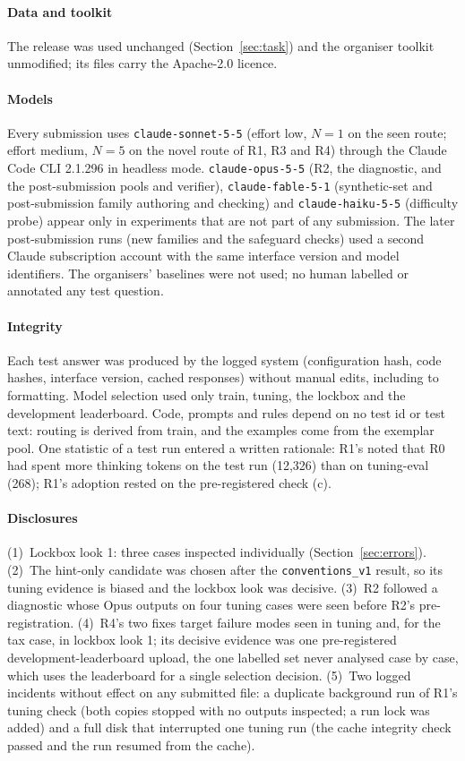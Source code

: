 \documentclass[conference]{IEEEtran}
\newcommand{\id}[1]{\texttt{#1}}
\begin{document}
\paragraph*{Data and toolkit}
The release was used unchanged (Section~\ref{sec:task}) and the organiser toolkit unmodified; its files carry the Apache-2.0 licence.

\paragraph*{Models}
Every submission uses \id{claude-sonnet-5-5} (effort low, $N=1$ on the seen route; effort medium, $N=5$ on the novel route of R1, R3 and R4) through the Claude Code CLI 2.1.296 in headless mode. \id{claude-opus-5-5} (R2, the diagnostic, and the post-submission pools and verifier), \id{claude-fable-5-1} (synthetic-set and post-submission family authoring and checking) and \id{claude-haiku-5-5} (difficulty probe) appear only in experiments that are not part of any submission. The later post-submission runs (new families and the safeguard checks) used a second Claude subscription account with the same interface version and model identifiers. The organisers' baselines were not used; no human labelled or annotated any test question.

\paragraph*{Integrity}
Each test answer was produced by the logged system (configuration hash, code hashes, interface version, cached responses) without manual edits, including to formatting. Model selection used only train, tuning, the lockbox and the development leaderboard. Code, prompts and rules depend on no test id or test text: routing is derived from train, and the examples come from the exemplar pool. One statistic of a test run entered a written rationale: R1's noted that R0 had spent more thinking tokens on the test run (12,326) than on tuning-eval (268); R1's adoption rested on the pre-registered check (c).

\paragraph*{Disclosures}
(1)~Lockbox look 1: three cases inspected individually (Section~\ref{sec:errors}). (2)~The hint-only candidate was chosen after the \id{conventions\_v1} result, so its tuning evidence is biased and the lockbox look was decisive. (3)~R2 followed a diagnostic whose Opus outputs on four tuning cases were seen before R2's pre-registration. (4)~R4's two fixes target failure modes seen in tuning and, for the tax case, in lockbox look 1; its decisive evidence was one pre-registered development-leaderboard upload, the one labelled set never analysed case by case, which uses the leaderboard for a single selection decision. (5)~Two logged incidents without effect on any submitted file: a duplicate background run of R1's tuning check (both copies stopped with no outputs inspected; a run lock was added) and a full disk that interrupted one tuning run (the cache integrity check passed and the run resumed from the cache).
\end{document}
